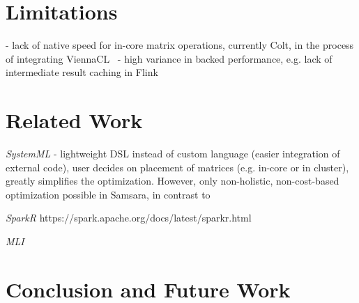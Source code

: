 \documentclass{article}
\begin{document}
\section{Limitations}

 - lack of native speed for in-core matrix operations, currently Colt, in the process of integrating ViennaCL~\cite{Tillet2013}
 - high variance in backed performance, e.g. lack of intermediate result caching in Flink

\section{Related Work}

{\em SystemML} \cite{Ghoting2011} - lightweight DSL instead of custom language (easier integration of external code), user decides on placement of matrices (e.g. in-core or in cluster), greatly simplifies the optimization. However, only non-holistic, non-cost-based optimization possible in Samsara, in contrast to~\cite{Boehm2014}

{\em SparkR} https://spark.apache.org/docs/latest/sparkr.html

{\em MLI} \cite{Sparks2013}

\section{Conclusion and Future Work}





\end{document}
